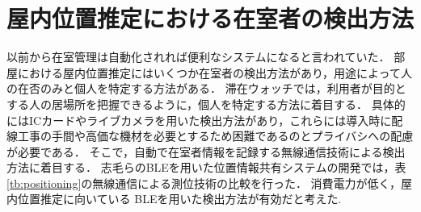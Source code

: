 \section{屋内位置推定における在室者の検出方法}\label{2.1}
以前から在室管理は自動化されれば便利なシステムになると言われていた\cite{twitter}．
部屋における屋内位置推定にはいくつか在室者の検出方法があり，用途によって人の在否のみと個人を特定する方法がある．
滞在ウォッチでは，利用者が目的とする人の居場所を把握できるように，個人を特定する方法に着目する．
具体的にはICカードやライブカメラを用いた検出方法があり，これらには導入時に配線工事の手間や高価な機材を必要とするため困難であるのとプライバシへの配慮が必要である．
そこで，自動で在室者情報を記録する無線通信技術による検出方法に着目する．
志毛らのBLEを用いた位置情報共有システムの開発\cite{communication}では，表\ref{tb:positioning}の無線通信による測位技術の比較を行った．
消費電力が低く，屋内位置推定に向いている BLEを用いた検出方法が有効だと考えた.